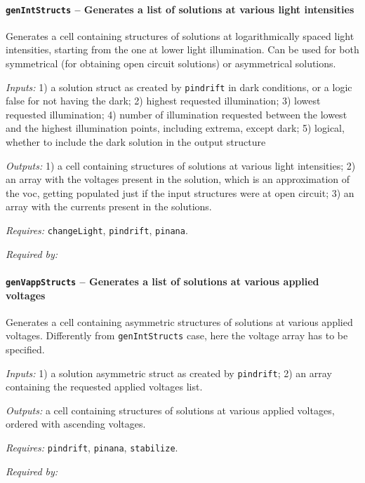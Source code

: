		\paragraph{\texttt{gen\-Int\-Structs} -- Generates a list of solutions at various light intensities}\label{genIntStructs}
Generates a cell containing structures of solutions at logarithmically spaced light intensities, starting from the one at lower light illumination. Can be used for both symmetrical (for obtaining open circuit solutions) or asymmetrical solutions.

		\textit{Inputs:} 1) a solution struct as created by \texttt{pindrift} in dark conditions, or a logic false for not having the dark; 
		2) highest requested illumination;
		3) lowest requested illumination;
		4) number of illumination requested between the lowest and the highest illumination points, including extrema, except dark;
		5) logical, whether to include the dark solution in the output     structure
		
\textit{Outputs:} 1) a cell containing structures of solutions at various light
     intensities;
2) an array with the voltages present in the solution, which is
     an approximation of the \gls{voc}, getting populated just if the input
     structures were at open circuit;
 3) an array with the currents present in the solutions.
 
\textit{Requires:} \texttt{change\-Light}, \texttt{pindrift}, \texttt{pinana}.

\textit{Required by:} 

		\paragraph{\texttt{gen\-Vapp\-Structs} -- Generates a list of solutions at various applied voltages}\label{genVappStructs}
Generates a cell containing asymmetric structures of solutions at various applied voltages.
Differently from \texttt{gen\-Int\-Structs} case, here the voltage array has to be specified.

\textit{Inputs:} 1) a solution asymmetric struct as created by \texttt{pindrift};
2) an array containing the requested applied voltages list.

\textit{Outputs:} a cell containing structures of solutions at various applied
     voltages, ordered with ascending voltages.
     
\textit{Requires:} \texttt{pindrift}, \texttt{pinana}, \texttt{stabilize}.

\textit{Required by:} 

